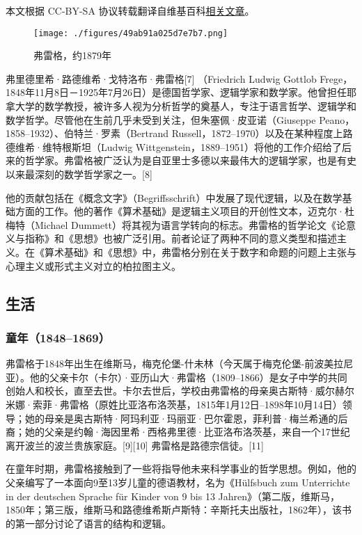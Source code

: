 
本文根据 CC-BY-SA 协议转载翻译自维基百科\href{https://en.wikipedia.org/wiki/Gottlob_Frege}{相关文章}。

\begin{figure}[ht]
\centering
\texttt{[image: ./figures/49ab91a025d7e7b7.png]}
\caption{弗雷格，约1879年} \label{fig_Gottlo_1}
\end{figure}
弗里德里希·路德维希·戈特洛布·弗雷格[7] （Friedrich Ludwig Gottlob Frege，1848年11月8日－1925年7月26日）是德国哲学家、逻辑学家和数学家。他曾担任耶拿大学的数学教授，被许多人视为分析哲学的奠基人，专注于语言哲学、逻辑学和数学哲学。尽管他在生前几乎未受到关注，但朱塞佩·皮亚诺（Giuseppe Peano，1858–1932）、伯特兰·罗素（Bertrand Russell，1872–1970）以及在某种程度上路德维希·维特根斯坦（Ludwig Wittgenstein，1889–1951）将他的工作介绍给了后来的哲学家。弗雷格被广泛认为是自亚里士多德以来最伟大的逻辑学家，也是有史以来最深刻的数学哲学家之一。[8] 

他的贡献包括在《概念文字》（Begriffsschrift）中发展了现代逻辑，以及在数学基础方面的工作。他的著作《算术基础》是逻辑主义项目的开创性文本，迈克尔·杜梅特（Michael Dummett）将其视为语言学转向的标志。弗雷格的哲学论文《论意义与指称》和《思想》也被广泛引用。前者论证了两种不同的意义类型和描述主义。在《算术基础》和《思想》中，弗雷格分别在关于数字和命题的问题上主张与心理主义或形式主义对立的柏拉图主义。
\subsection{生活}  
\subsubsection{童年（1848–1869）}  
弗雷格于1848年出生在维斯马，梅克伦堡-什未林（今天属于梅克伦堡-前波美拉尼亚）。他的父亲卡尔（卡尔）·亚历山大·弗雷格（1809–1866）是女子中学的共同创始人和校长，直至去世。卡尔去世后，学校由弗雷格的母亲奥古斯特·威尔赫尔米娜·索菲·弗雷格（原姓比亚洛布洛茨基，1815年1月12日–1898年10月14日）领导；她的母亲是奥古斯特·阿玛利亚·玛丽亚·巴尔霍恩，菲利普·梅兰希通的后裔；她的父亲是约翰·海因里希·西格弗里德·比亚洛布洛茨基，来自一个17世纪离开波兰的波兰贵族家庭。[9][10] 弗雷格是路德宗信徒。[11]

在童年时期，弗雷格接触到了一些将指导他未来科学事业的哲学思想。例如，他的父亲编写了一本面向9至13岁儿童的德语教材，名为《Hülfsbuch zum Unterrichte in der deutschen Sprache für Kinder von 9 bis 13 Jahren》（第二版，维斯马，1850年；第三版，维斯马和路德维希斯卢斯特：辛斯托夫出版社，1862年），该书的第一部分讨论了语言的结构和逻辑。

